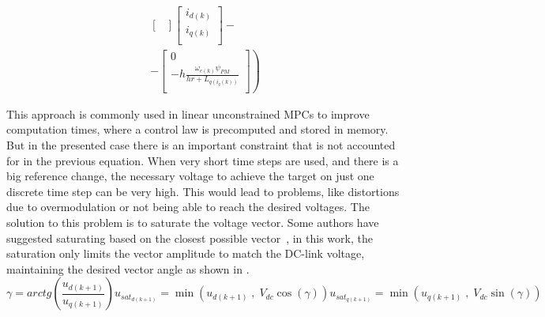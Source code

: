 \documentclass[9pt,conference]{IEEEtran}
\begin{document}
\begin{equation}
\begin{aligned}
\begin{bmatrix}
        \end{bmatrix}
		\begin{bmatrix}
				i_{d(k)} \\
				i_{q(k)} \\
        \end{bmatrix}
        -\\- \left.
		\begin{bmatrix}
				0                                                 \\
				-h\frac{\omega_{e(k)}\psi_{PM}}{hr+L_{q(i_q(k))}} \\
			\end{bmatrix}
		\right)
	\end{aligned}
\end{equation}

This approach is commonly used in linear unconstrained MPCs to improve computation times, where a control law is precomputed and stored in memory. But in the presented case there is an important constraint that is not accounted for in the previous equation. When very short time steps are used, and there is a big reference change, the necessary voltage to achieve the target on just one discrete time step can be very high. This would lead to problems, like distortions due to overmodulation or not being able to reach the desired voltages. The solution to this problem is to saturate the voltage vector. Some authors have suggested saturating based on the closest possible vector~\cite{Fernando:fast_predictive:2013}, in this work, the saturation only limits the vector amplitude to match the DC-link voltage, maintaining the desired vector angle as shown in .
\begin{subequations}
	\begin{equation}
			\gamma = arctg\left(\frac{u_{d(k+1)}}{u_{q(k+1)}}\right)
	\end{equation}
	\begin{equation}
		u_{sat_{d(k+1)}} = \min\left(u_{d(k+1)}\;,\; V_{dc}\cos(\gamma)\right)
	\end{equation}
	\begin{equation}
		u_{sat_{q(k+1)}} = \min\left(u_{q(k+1)}\;,\; V_{dc}\sin(\gamma)\right)
	\end{equation}
	\label{eq:Vdq_saturation}
\end{subequations}

\end{document}
